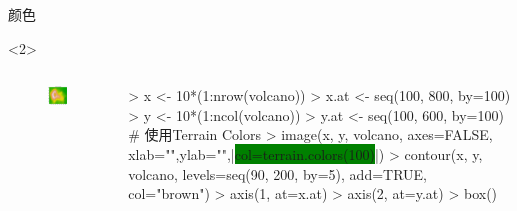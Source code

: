 \documentclass{beamerthemeMono}
\begin{document}
\begin{frame}[t,fragile]{\subsecname}{颜色}
\begin{overlayarea}{\textwidth}{\textheight}
\begin{onlyenv}<2>
  \begin{columns}
    \begin{column}{.4\textwidth}
\centering
\begin{figure}
  \includegraphics[width=\columnwidth]{terrain_colors.png}
\end{figure}
    \end{column}

    \begin{column}{.6\textwidth}
\centering
\begin{rcode}
> x <- 10*(1:nrow(volcano))
> x.at <- seq(100, 800, by=100)
> y <- 10*(1:ncol(volcano))
> y.at <- seq(100, 600, by=100)
# 使用Terrain Colors 
> image(x, y, volcano, axes=FALSE, xlab="",ylab="",|\colorbox{green}{col=terrain.colors(100)}|)
> contour(x, y, volcano, levels=seq(90, 200, by=5), add=TRUE, col="brown")
> axis(1, at=x.at)
> axis(2, at=y.at)
> box()
\end{rcode}
    \end{column}
  \end{columns}
\end{onlyenv}


\end{overlayarea}
\end{frame}
\end{document}
